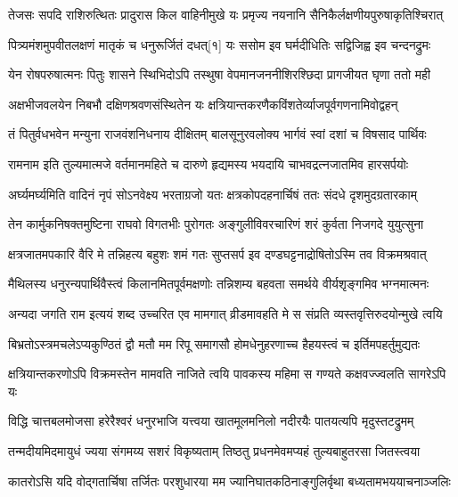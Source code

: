 \twolineshloka
{तेजसः सपदि राशिरुत्थितः प्रादुरास किल वाहिनीमुखे}
{यः प्रमृज्य नयनानि सैनिकैर्लक्षणीयपुरुषाकृतिश्चिरात्}%

\twolineshloka
{पित्र्यमंशमुपवीतलक्षणं मातृकं च धनुरूर्जितं दधत्[१]}
{यः ससोम इव घर्मदीधितिः सद्विजिह्व इव चन्दनद्रुमः}%

\twolineshloka
{येन रोषपरुषात्मनः पितुः शासने स्थिभिदोऽपि तस्थुषा}
{वेपमानजननीशिरश्छिदा प्रागजीयत घृणा ततो मही}%

\twolineshloka
{अक्षभीजवलयेन निबभौ दक्षिणश्रवणसंस्थितेन यः}
{क्षत्रियान्तकरणैकविंशतेर्व्याजपूर्वगणनामिवोद्वहन्}%

\twolineshloka
{तं पितुर्वधभवेन मन्युना राजवंशनिधनाय दीक्षितम्}
{बालसूनुरवलोक्य भार्गवं स्वां दशां च विषसाद पार्थिवः}%

\twolineshloka
{रामनाम इति तुल्यमात्मजे वर्तमानमहिते च दारुणे}
{हृद्यमस्य भयदायि चाभवद्रत्नजातमिव हारसर्पयोः}%

\twolineshloka
{अर्घ्यमर्घ्यमिति वादिनं नृपं सोऽनवेक्ष्य भरताग्रजो यतः}
{क्षत्रकोपदहनार्चिषं ततः संदधे दृशमुदग्रतारकाम्}%

\twolineshloka
{तेन कार्मुकनिषक्तमुष्टिना राघवो विगतभीः पुरोगतः}
{अङ्गुलीविवरचारिणं शरं कुर्वता निजगदे युयुत्सुना}%

\twolineshloka
{क्षत्रजातमपकारि वैरि मे तन्निहत्य बहुशः शमं गतः}
{सुप्तसर्प इव दण्डघट्टनाद्रोषितोऽस्मि तव विक्रमश्रवात्}%

\twolineshloka
{मैथिलस्य धनुरन्यपार्थिवैस्त्वं किलानमितपूर्वमक्षणोः}
{तन्निशम्य बहवता समर्थये वीर्यशृङ्गमिव भग्नमात्मनः}%

\twolineshloka
{अन्यदा जगति राम इत्ययं शब्द उच्चरित एव मामगात्}
{व्रीडमावहति मे स संप्रति व्यस्तवृत्तिरुदयोन्मुखे त्वयि}%

\twolineshloka
{बिभ्रतोऽस्त्रमचलेऽप्यकुण्ठितं द्वौ मतौ मम रिपू समागसौ}
{होमधेनुहरणाच्च हैहयस्त्वं च इर्तिमपहर्तुमुद्यतः}%

\twolineshloka
{क्षत्रियान्तकरणोऽपि विक्रमस्तेन मामवति नाजिते त्वयि}
{पावकस्य महिमा स गण्यते कक्षवज्ज्वलति सागरेऽपि यः}%

\twolineshloka
{विद्धि चात्तबलमोजसा हरेरैश्वरं धनुरभाजि यत्त्वया}
{खातमूलमनिलो नदीरयैः पातयत्यपि मृदुस्तटद्रुमम्}%

\twolineshloka
{तन्मदीयमिदमायुधं ज्यया संगमय्य सशरं विकृष्यताम्}
{तिष्ठतु प्रधनमेवमप्यहं तुल्यबाहुतरसा जितस्त्वया}%

\twolineshloka
{कातरोऽसि यदि वोद्गतार्चिषा तर्जितः परशुधारया मम}
{ज्यानिघातकठिनाङ्गुलिर्वृथा बध्यतामभययाचनाञ्जलिः}%

